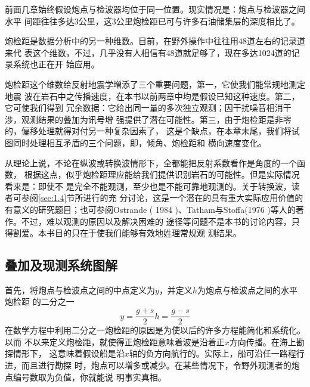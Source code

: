 前面几章始终假设炮点与检波器均位于同一位置。现实情况是：炮点与检波器之间水平
间距往往多达3公里，这3公里炮检距已可与许多石油储集层的深度相比了。

炮检距是数据分析中的另一种维数。目前，在野外操作中往往用48道左右的记录道来代
表这个维数，不过，几乎没有人相信有48道就足够了，现在多达1024道的记录系统也正在开
始应用。

炮检距这个维数给反射地震学増添了三个重要问题，第一，它使我们能常规地测定地震
波在岩石中之传播速度，在本书以前两章中均是假设已知这种速度。第二，它可使我们得到
冗余数据：它给出同一量的多次独立观测；因干扰噪音相消干涉，观测结果的叠加为讯号增
强提供了潜在可能性。第三，由于炮检距是非零的，偏移处理就得对付另一种复杂因素了，
这是个缺点，在本章末尾，我们将试图同时处理相互矛盾的三个问题，即，倾角、炮检距和
横向速度变化。

从理论上说，不论在纵波或转换波情形下，全都能把反射系数看作是角度的一个函数，
根据这点，似乎炮检距理应能给我们提供识别岩石的可能性。但是实际情况看来是：即使不
是完全不能观测，至少也是不能可靠地观测的。关于转换波，读者可参阅\ref{sec:1.4}节所进行的充
分讨论，这是一个潜在的具有重大实际应用价值的有意义的研究题目；也可参阅Ostrande
( 1984 )、Tatham与Stoffa(1976
)等人的著作。不过，难以观测的原因以及解决困难的
途径等问题不是本书的讨论内容，只得割爱。本书目的只在于使我们能够有效地姓理常规观
测结果。

\subsection{叠加及现测系统图解}
\label{sec:3.0.1}

首先，将炮点与检波点之间的中点定义为$y$，并定义$h$为炮点与检波点之间的水平炮检距
的二分之一
\begin{subequations}
\begin{equation}
y=\frac{g+s}{2}
\label{eq:ex3.0.1a}
\end{equation}
\begin{equation}
h=\frac{g-s}{2}
\label{eq:ex3.0.1b}
\end{equation}
\label{eq:ex3.0.1}
\end{subequations}
在数学方程中利用二分之一炮检距的原因是为使以后的许多方程能简化和系统化。以而
不以来定义炮检距，就使得正炮检距意味着波是沿着正$x$方向传播。在海上勘探情形下，
这意味着假设船是沿$x$轴的负方向航行的。实际上，船可沿任一路程行进，而且进行勘探
时，炮点可以増多或减少。在某些情况下，令野外观测者的炮点编号数取为负值，你就能说
明事实真相。

